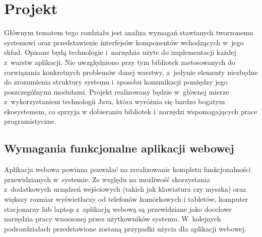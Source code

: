 \documentclass[11pt]{aghdpl}
\begin{document}

\chapter{Projekt}
\label{cha:dobor_technologii_i_narzedzi}

Głównym tematem tego rozdziału jest analiza wymagań stawianych tworzonemu systemowi oraz przedstawienie interfejsów komponentów wchodzących w~jego skład. Opisane będą technologie i~narzędzia użyte do implementacji każdej z~warstw aplikacji. Nie uwzględniono przy tym bibliotek zastosowanych do rozwiązania konkretnych problemów danej warstwy, a~jedynie elementy niezbędne do zrozumienia struktury systemu i~sposobu komunikacji pomiędzy jego poszczególnymi modułami. Projekt realizowany będzie w~głównej mierze z~wykorzystaniem technologii Java, która wyróżnia się bardzo bogatym ekosystemem, co sprzyja w dobieraniu bibliotek i~narzędzi wspomagających prace programistyczne.

\section {Wymagania funkcjonalne aplikacji webowej}

Aplikacja webowa powinna pozwalać na zrealizowanie kompletu funkcjonalności przewidzianych w~systemie. Ze względu na możliwość skorzystania z~dodatkowych urządzeń wejściowych (takich jak klawiatura czy myszka) oraz większy rozmiar wyświetlaczy od telefonów komórkowych i tabletów, komputer stacjonarny lub laptop z~aplikacją webową są przewidziane jako docelowe narzędzia pracy wnoszonej przez użytkowników systemu. W~kolejnych podrozdziałach przedstawione zostaną przypadki użycia dla aplikacji webowej.

\def\useCaseNazwa{Funkcja}
\def\useCaseUzytkownik{Zarejestrowany użytkownik (lekarz)}
\def\useCaseAktor{Aktor}
\def\useCaseWarPocz{Warunki początkowe}
\def\useCaseScenAlt{Scenariusz alternatywny}
\def\useCaseScenBaz{Przebieg interakcji}
\def\useCaseWarKonc{Warunki końcowe}
\def\useCaseWyjatek{Wyjątek}
\def\useCaseZdarzInicj{Zdarzenie inicjujące}
\def\useCaseEnd{Scenariusz jest przerywany.}

%
%
\newcommand{\useCaseContinue}[1]{Scenariusz jest kontynuowany od punktu #1.}
\end{document}
